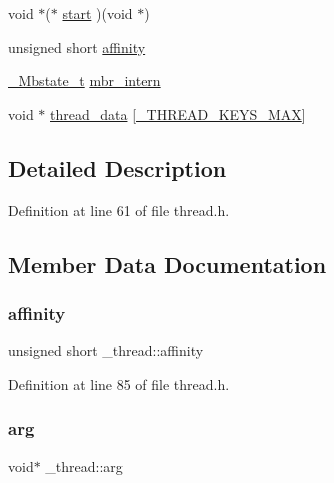 \begin{DoxyCompactItemize}
\item 
void $\ast$($\ast$ \mbox{\hyperlink{struct__thread_aced825c6b63172f82cd026db0472db2e}{start}} )(void $\ast$)
\item 
unsigned short \mbox{\hyperlink{struct__thread_a1c8bc89fd242f53ae10993f17e80e449}{affinity}}
\item 
\mbox{\hyperlink{wchar__t_8h_a1e09beddcdd9f7bff253836c6de67964}{\+\_\+\+Mbstate\+\_\+t}} \mbox{\hyperlink{struct__thread_a7a9e7af384abbfb902e54ce4f16e4654}{mbr\+\_\+intern}}
\item 
void $\ast$ \mbox{\hyperlink{struct__thread_a71816284f1e2caf1bca6b6f6b30454a1}{thread\+\_\+data}} \mbox{[}\mbox{\hyperlink{thread_8h_ae7fee02a354b0f3c3d1f2581b2c00c27}{\+\_\+\+T\+H\+R\+E\+A\+D\+\_\+\+K\+E\+Y\+S\+\_\+\+M\+AX}}\mbox{]}
\end{DoxyCompactItemize}


\subsection{Detailed Description}


Definition at line 61 of file thread.\+h.



\subsection{Member Data Documentation}
\mbox{\label{struct__thread_a1c8bc89fd242f53ae10993f17e80e449}} 
\subsubsection{\texorpdfstring{affinity}{affinity}}
{\footnotesize\ttfamily unsigned short \+\_\+thread\+::affinity}



Definition at line 85 of file thread.\+h.

\mbox{\label{struct__thread_a33b6b5cd25cf365d42d7c866cada4446}} 
\subsubsection{\texorpdfstring{arg}{arg}}
{\footnotesize\ttfamily void$\ast$ \+\_\+thread\+::arg}



